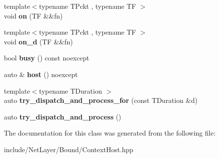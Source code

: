 \begin{DoxyCompactItemize}
\item 
\hypertarget{classexperiment_1_1ContextHost_a30edc8ffb1bdbc07e90e46990fba4f04}{}{\footnotesize template$<$typename T\+Pckt , typename T\+F $>$ }\\void {\bfseries on} (T\+F \&\&fn)\label{classexperiment_1_1ContextHost_a30edc8ffb1bdbc07e90e46990fba4f04}

\item 
\hypertarget{classexperiment_1_1ContextHost_a95781cbfbf975455ae1dec256e8f329a}{}{\footnotesize template$<$typename T\+Pckt , typename T\+F $>$ }\\void {\bfseries on\+\_\+d} (T\+F \&\&fn)\label{classexperiment_1_1ContextHost_a95781cbfbf975455ae1dec256e8f329a}

\item 
\hypertarget{classexperiment_1_1ContextHost_afb39c3ebae58dcd5aa8afc8346814dc3}{}bool {\bfseries busy} () const  noexcept\label{classexperiment_1_1ContextHost_afb39c3ebae58dcd5aa8afc8346814dc3}

\item 
\hypertarget{classexperiment_1_1ContextHost_aef94042a8ad58227d4b1a0ae7be4ff62}{}auto \& {\bfseries host} () noexcept\label{classexperiment_1_1ContextHost_aef94042a8ad58227d4b1a0ae7be4ff62}

\item 
\hypertarget{classexperiment_1_1ContextHost_a2fe68c36c9fc33fbd9e821606ebbc28c}{}{\footnotesize template$<$typename T\+Duration $>$ }\\auto {\bfseries try\+\_\+dispatch\+\_\+and\+\_\+process\+\_\+for} (const T\+Duration \&d)\label{classexperiment_1_1ContextHost_a2fe68c36c9fc33fbd9e821606ebbc28c}

\item 
\hypertarget{classexperiment_1_1ContextHost_a41af40283cb5c0152e912b94e925e074}{}auto {\bfseries try\+\_\+dispatch\+\_\+and\+\_\+process} ()\label{classexperiment_1_1ContextHost_a41af40283cb5c0152e912b94e925e074}

\end{DoxyCompactItemize}


The documentation for this class was generated from the following file\+:\begin{DoxyCompactItemize}
\item 
include/\+Net\+Layer/\+Bound/Context\+Host.\+hpp\end{DoxyCompactItemize}
